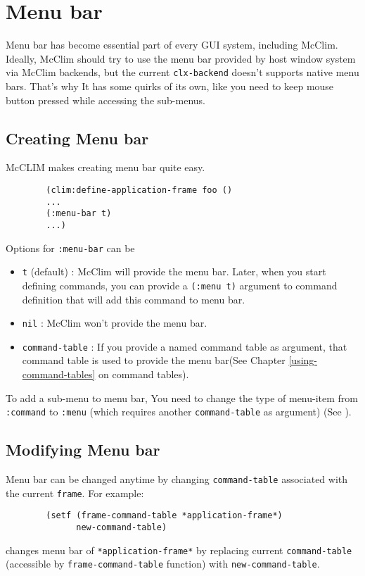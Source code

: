 \chapter{Menu bar}

Menu bar has become essential part of every GUI system, including
McClim. Ideally, McClim should try to use the menu bar provided by
host window system via McClim backends, but the current
\texttt{clx-backend} doesn't supports native menu bars. That's why It
has some quirks of its own, like you need to keep mouse button pressed
while accessing the sub-menus.

\section{Creating Menu bar}
\label{creating-menu-bar}

McCLIM makes creating menu bar quite easy.

\begin{verbatim}
        (clim:define-application-frame foo ()
        ...
        (:menu-bar t)
        ...)
\end{verbatim}

Options for \texttt{:menu-bar} can be
\begin{itemize}
\item
  \texttt{t} (default) : McClim will provide the menu bar. Later, when
  you start defining commands, you can provide a \texttt{(:menu t)}
  argument to command definition that will add this command to menu
  bar.
\item
  \texttt{nil} : McClim won’t provide the menu bar.
\item
  \texttt{command-table} : If you provide a named command table as
  argument, that command table is used to provide the menu bar(See
  Chapter \ref{using-command-tables} on command tables).
\end{itemize}

To add a sub-menu to menu bar, You need to change the type of
menu-item from \texttt{:command} to \texttt{:menu} (which requires
another \texttt{command-table} as argument) (See
).

\section{Modifying Menu bar}

Menu bar can be changed anytime by changing \texttt{command-table}
associated with the current \texttt{frame}. For example:
\begin{verbatim}
        (setf (frame-command-table *application-frame*) 
              new-command-table)
\end{verbatim}
changes menu bar of \texttt{*application-frame*} by replacing current
\texttt{command-table} (accessible by \texttt{frame-command-table}
function) with \texttt{new-command-table}.

